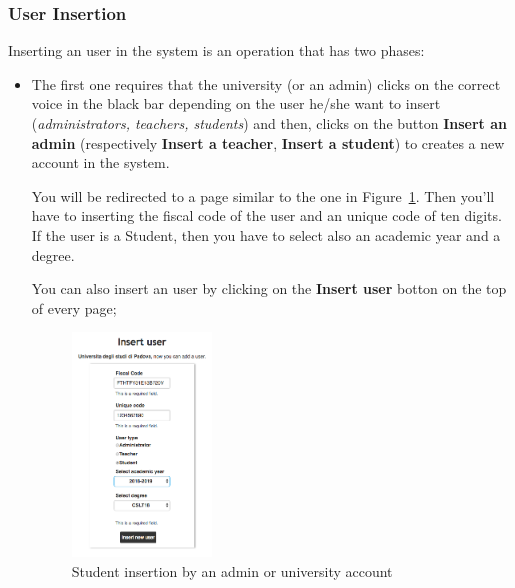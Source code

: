 \subsubsection{User Insertion}
Inserting an user in the system is an operation that has two phases: 
\begin{itemize}
	\item The first one requires that the university (or an admin) clicks on the correct voice in the black bar depending on the user he/she want to insert (\emph{administrators, teachers, students}) and then, clicks on the button \textbf{Insert an admin} (respectively \textbf{Insert a teacher}, \textbf{Insert a student}) to creates a new account in the system.
	
	You will be redirected to a page similar to the one in Figure~\ref{fig:userInsertionStudent}. Then you'll have to inserting the fiscal code of the user and an unique code of ten digits. If the user is a Student, then you have to select also an academic year and a degree.
	
	You can also insert an user by clicking on the \textbf{Insert user} botton on the top of every page;
	\begin{figure}[H]
		\centering
		\includegraphics[width=0.35\textwidth]{img/userInsertionStudent.png}
		\caption{Student insertion by an admin or university account}
		\label{fig:userInsertionStudent}
	\end{figure}
	

\end{itemize}
